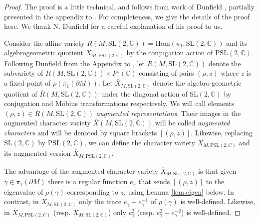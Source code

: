 \documentclass[12pt]{amsart}
\theoremstyle{definition}
\def\BC{\mathbb C}
\def\ga{\gamma}
\def\SL{\mathrm{SL}}
\def\PSL{\mathrm{PSL}}
\def\pt{\partial}
\def\Hom{\mathrm{Hom}}
\numberwithin{equation}{section}
\begin{document}
\begin{proof}
The proof is a little technical, and follows from work of  
Dunfield \cite[Cor.3.2]{Dn}, partially presented in the appendix to 
\cite{BDR-V}. For completeness, we give the details of the proof here.
We thank N. Dunfield for a careful explanation of his proof to us.

Consider the affine variety $R(M,\SL(2,\BC))=\Hom(\pi_1,\SL(2,\BC))$
and its algebrogeometric quotient $X_{M,\PSL(2,\BC)}$ 
by the conjugation action of $\PSL(2,\BC)$. Following Dunfield from the
Appendix to \cite{BDR-V}, let $\overline{R}(M,\SL(2,\BC))$ denote
the subvariety of $R(M,\SL(2,\BC)) \times P^1(\BC)$ consisting of pairs 
$(\rho,z)$ where $z$ is a fixed point of $\rho(\pi_1(\pt M))$. Let 
$\overline{X}_{M,\SL(2,\BC)}$ denote the algebro-geometric quotient of 
$\overline{R}(M,\SL(2,\BC))$ under the diagonal action of $\SL(2,\BC)$
by conjugation and M\"obius transformations respectively. 
We will call elements $(\rho,z) \in \overline{R}(M,\SL(2,\BC))$ 
{\em augmented representations}. Their images in the augmented character 
variety $\overline{X}(M,\SL(2,\BC))$  will be called 
{\em augmented characters} and will be denoted by square
brackets $[(\rho,z)]$. Likewise, replacing $\SL(2,\BC)$ by
$\PSL(2,\BC)$, we can define the character variety $X_{M,\PSL(2,C)}$ and
its augmented version $\overline{X}_{M,\PSL(2,\BC)}$.

The advantage of the augmented character variety $\overline{X}_{M,\SL(2,\BC)}$
is that given $\ga \in \pi_1(\pt M)$ there is a regular function $e_{\ga}$ 
that sends $[(\rho,z)]$ to the eigenvalue of $\rho(\ga)$ corresponding to 
$z$, using Lemma \ref{lem.eigen} below.
In contrast, in $X_{M,\SL(2,\BC)}$ only the trace $e_{\ga}+e_{\ga}^{-1}$
of $\rho(\ga)$ is well-defined. 
Likewise, in $\overline{X}_{M,\PSL(2,C)}$ (resp. $X_{M,\SL(2,\BC)}$) only 
$e_{\ga}^2$ (resp. $e_{\ga}^2+e_{\ga}^{-2}$) is well-defined.


\end{proof}
\end{document}
